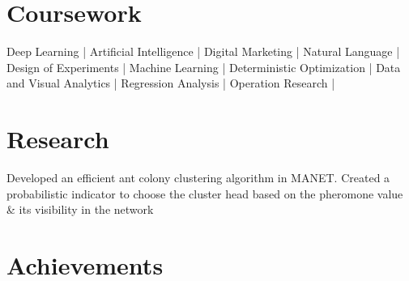 \documentclass[]{resume-openfont}
\begin{document}
\begin{minipage}[t]{0.33\textwidth}

\section{Coursework}
Deep Learning | Artificial Intelligence | 
Digital Marketing |
Natural Language | 
Design of Experiments | 
Machine Learning | 
Deterministic Optimization |
Data and Visual Analytics | 
Regression Analysis |
Operation Research | 
\sectionsep



\section{Research}
Developed an efficient ant colony clustering algorithm in MANET. Created a probabilistic indicator to choose the cluster head based on the pheromone value \& its visibility in the network
\sectionsep

\section{Achievements}
\runsubsection{}
\vspace{\topsep} 
 \\
\sectionsep


%
%

\end{minipage} 
\hfill
\end{document}
